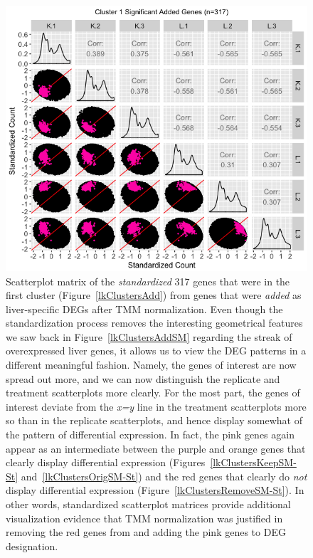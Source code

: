 \documentclass[11pt,a4paper,oldfontcommands,openany]{memoir}
\numberwithin{equation}{section} %
\begin{document}
\null
\begin{figure}[t!]
\begin{framed}
\centerline{\includegraphics[width=1\columnwidth]{MakeFigures/lkClustersAddSM-St.jpg}}
\end{framed}
\caption{Scatterplot matrix of the \textit{standardized} 317 genes that were in the first cluster (Figure~\ref{lkClustersAdd}) from genes that were \textit{added} as liver-specific DEGs after TMM normalization. Even though the standardization process removes the interesting geometrical features we saw back in Figure~\ref{lkClustersAddSM} regarding the streak of overexpressed liver genes, it allows us to view the DEG patterns in a different meaningful fashion. Namely, the genes of interest are now spread out more, and we can now distinguish the replicate and treatment scatterplots more clearly. For the most part, the genes of interest deviate from the \textit{x=y} line in the treatment scatterplots more so than in the replicate scatterplots, and hence display somewhat of the pattern of differential expression. In fact, the pink genes again appear as an intermediate between the purple and orange genes that clearly display differential expression (Figures~\ref{lkClustersKeepSM-St} and~\ref{lkClustersOrigSM-St}) and the red genes that clearly do \textit{not} display differential expression (Figure~\ref{lkClustersRemoveSM-St}). In other words, standardized scatterplot matrices provide additional visualization evidence that TMM normalization was justified in removing the red genes from and adding the pink genes to DEG designation.
\label{lkClustersAddSM-St}}
\end{figure}
\end{document}
